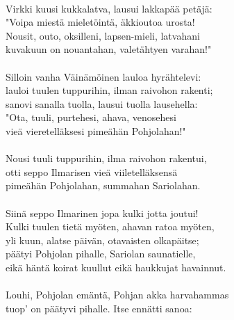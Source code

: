                                                                   \\
Virkki kuusi kukkalatva, lausui lakkapää petäjä:                  \\
"Voipa miestä mieletöintä, äkkioutoa urosta!                      \\
Nousit, outo, oksilleni, lapsen-mieli, latvahani                  \\
kuvakuun on nouantahan, valetähtyen varahan!"                     \\
                                                                  \\
Silloin vanha Väinämöinen lauloa hyrähtelevi:                     \\
lauloi tuulen tuppurihin, ilman raivohon rakenti;                 \\
sanovi sanalla tuolla, lausui tuolla lausehella:                  \\
"Ota, tuuli, purtehesi, ahava, venosehesi                         \\
vieä vieretelläksesi pimeähän Pohjolahan!"                        \\
                                                                  \\
Nousi tuuli tuppurihin, ilma raivohon rakentui,                   \\
otti seppo Ilmarisen vieä viiletelläksensä                        \\
pimeähän Pohjolahan, summahan Sariolahan.                         \\
                                                                  \\
Siinä seppo Ilmarinen jopa kulki jotta joutui!                    \\
Kulki tuulen tietä myöten, ahavan ratoa myöten,                   \\
yli kuun, alatse päivän, otavaisten olkapäitse;                   \\
päätyi Pohjolan pihalle, Sariolan saunatielle,                    \\
eikä häntä koirat kuullut eikä haukkujat havainnut.               \\
                                                                  \\
Louhi, Pohjolan emäntä, Pohjan akka harvahammas                   \\
tuop' on päätyvi pihalle. Itse ennätti sanoa:                     \\
